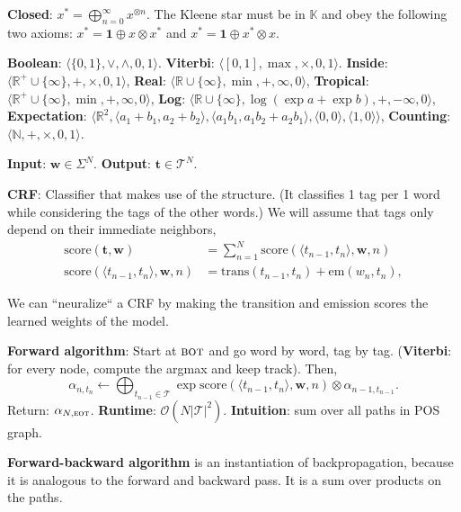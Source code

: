 \documentclass{article}
\def\score{\mathrm{score}}
\newenvironment{topic}[1]
{\begin{tcolorbox}[
  title=#1,
  breakable,
  colback=white,
  colframe=black,
  fonttitle={\bfseries\sffamily},
  sharp corners,
  boxrule=0.5pt,
  boxsep=0.1cm,
  top=0cm,
  bottom=0cm,
  left=0.1cm,
  right=0.1cm,
  enhanced jigsaw,
]}
{\end{tcolorbox}}
\begin{document}
\begin{multicols}{3}
\begin{topic}{Semirings}
  \textbf{Closed}: $x^* = \bigoplus_{n=0}^\infty x^{\otimes n}$. The Kleene
  star must be in $\mathbb{K}$ and obey the following two axioms: $x^* = \bm{1}
  \oplus x \otimes x^*$ and $x^* = \bm{1} \oplus x^* \otimes x$.

  \textbf{Boolean}: $\langle \{ 0,1 \}, \lor, \land, 0, 1 \rangle$.
  \textbf{Viterbi}: $\langle [0,1], \max,\times,0,1 \rangle$.
  \textbf{Inside}: $\langle \mathbb{R}^+ \cup \{ \infty
  \},+,\times,0,1 \rangle$, \textbf{Real}: $\langle \mathbb{R} \cup \{
    \infty \}, \min, +, \infty, 0 \rangle$, \textbf{Tropical}:
  $\langle \mathbb{R}^+ \cup \{ \infty \}, \min, +,\infty,0 \rangle$,
  \textbf{Log}: $\langle \mathbb{R} \cup \{ \infty \}, \log(\exp a +
  \exp b), +, -\infty, 0 \rangle$, \textbf{Expectation}: $\langle
  \mathbb{R}^2, \langle a_1+b_1, a_2+b_2 \rangle, \langle a_1b_1,
  a_1b_2 + a_2b_1 \rangle, \langle 0,0 \rangle, \langle 1,0 \rangle
  \rangle$, \textbf{Counting}: $\langle \mathbb{N}, +, \times, 0, 1 \rangle$.
\end{topic}

\begin{topic}{Part-of-speech tagging}
  \textbf{Input}: $\bm{w}\in\Sigma^N$. \textbf{Output}:
  $\bm{t}\in\mathcal{T}^N$.

  \textbf{CRF}: Classifier that makes use of the structure. (It
  classifies 1 tag per 1 word while considering the tags of the other
  words.) We will assume that tags only depend on their immediate
  neighbors,
  \begin{align*}
    \score(\bm{t},\bm{w}) &= \sum_{n=1}^N \score(\langle t_{n-1},t_n \rangle, \bm{w},n) \\
    \score(\langle t_{n-1},t_n \rangle, \bm{w}, n) &= \mathrm{trans}(t_{n-1},t_n) + \mathrm{em}(w_n,t_n)
  ,\end{align*}

  We can ``neuralize`` a CRF by making the transition and emission scores the
  learned weights of the model.

  \textbf{Forward algorithm}: Start at $\textsc{bot}$ and go word by word, tag
  by tag. (\textbf{Viterbi}: for every node, compute the argmax and keep
  track). Then, \[
    \alpha_{n,t_n} \gets \bigoplus_{t_{n-1}\in\mathcal{T}} \exp \score(\langle t_{n-1},t_n \rangle, \bm{w},n) \otimes \alpha_{n-1,t_{n-1}}
  .\]
  Return: $\alpha_{N,\textsc{eot}}$. \textbf{Runtime}:
  $\mathcal{O}(N|\mathcal{T}|^2)$. \textbf{Intuition}: sum over all paths in
  POS graph.

  \textbf{Forward-backward algorithm} is an instantiation of
  backpropagation, because it is analogous to the forward and backward
  pass. It is a sum over products on the paths.


\end{topic}
\end{multicols}
\end{document}
